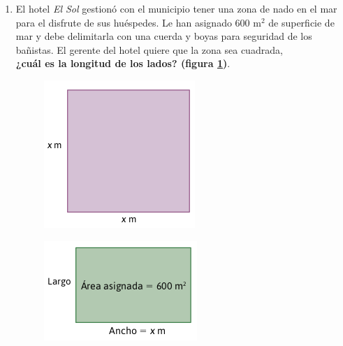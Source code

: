 \documentclass[11pt]{book}
\begin{document}
\begin{enumerate}
  \item El hotel \emph{El Sol} gestionó con el municipio tener una zona de nado en el mar
        para el disfrute de sus huéspedes. Le han asignado 600 m$^2$ de superficie
        de mar y debe delimitarla con una cuerda y boyas para seguridad de los
        bañistas. El gerente del hotel quiere que la zona sea cuadrada, \\
        \textbf{¿cuál es la longitud de los lados? (figura \ref{fig:square})}.

        \begin{minipage}{.45\textwidth}
          \begin{figure}[H]
            \centering
            \includegraphics[width=0.7\linewidth]{square.png}
            \label{fig:square}
          \end{figure}%
        \end{minipage}\hfill
        \begin{minipage}{.45\textwidth}
          \begin{figure}[H]
            \centering
            \includegraphics[width=0.8\linewidth]{square2.png}
            \label{fig:square2}
          \end{figure}
        \end{minipage}


\end{enumerate}
\end{document}
